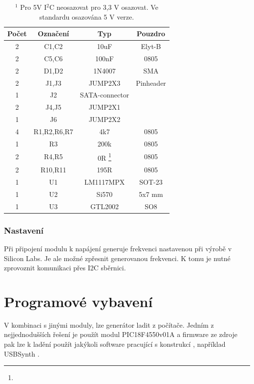 \documentclass[12pt,a4paper,oneside]{article}
\begin{document}
\begin{table}[h!]
\begin{center}
\begin{tabular}{ |c|c|c|c| }
\hline 
Počet & Označení & Typ  & Pouzdro  \\ 
\hline 
2 & C1,C2 & 10uF & Elyt-B \\
2 &	C5,C6 & 100nF & 0805 \\
2 &	D1,D2 & 1N4007 & SMA \\
2 & J1,J3 & JUMP2X3 & Pinheader \\
1 &	J2 & SATA-connector & \\ 
2 &	J4,J5 & JUMP2X1 & \\
1 &	J6 & JUMP2X2 & \\
4 & R1,R2,R6,R7 & 4k7 & 0805 \\
1 &	R3 & 200k & 0805 \\
2 &	R4,R5 & 0R \footnote{} & 0805\\
2 &	R10,R11 & 195R & 0805 \\
1 &	U1 & LM1117MPX & SOT-23 \\
1 & U2 & Si570 & 5x7 mm \\
1 &	U3 & GTL2002 & SO8 \\
\hline 
\end{tabular}
\end{center}
\caption{$^1$ Pro 5V I$^2$C neosazovat pro 3,3 V osazovat. Ve standardu osazována 5 V verze.}
\label{seznam_soucastek}
\end{table}


\subsubsection{Nastavení}
Při připojení modulu k napájení generuje frekvenci nastavenou při výrobě v Silicon Labs. Je ale možné zpřesnit generovanou frekvenci. K tomu je nutné zprovoznit komunikaci přes I2C sběrnici. 

\section{Programové vybavení}
V kombinaci s jinými moduly, lze generátor ladit z počítače. Jedním z nejjednodušších řešení je použít modul PIC18F4550v01A a firmware ze zdroje \cite{DG8SAQemulator} pak lze k ladění použít jakýkoli software pracující s konstrukcí \cite{DG8SAQSynthesizer}, například USBSynth \cite{USB_Synth}.
\end{document}
